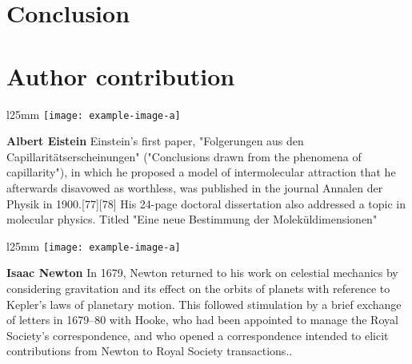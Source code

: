 \documentclass{SFEE}
\begin{document}
\section{Conclusion}
\lipsum[18-27]

 


\section*{Author contribution}

\begin{wrapfigure}{l}{25mm} 
    \texttt{[image: example-image-a]}
  \end{wrapfigure}\par
  \textbf{Albert Eistein} Einstein's first paper, "Folgerungen aus den Capillaritätserscheinungen" ("Conclusions drawn from the phenomena of capillarity"), in which he proposed a model of intermolecular attraction that he afterwards disavowed as worthless, was published in the journal Annalen der Physik in 1900.[77][78] His 24-page doctoral dissertation also addressed a topic in molecular physics. Titled "Eine neue Bestimmung der Moleküldimensionen"\par

\begin{wrapfigure}{l}{25mm} 
    \texttt{[image: example-image-a]}
  \end{wrapfigure}\par
  \textbf{Isaac Newton} In 1679, Newton returned to his work on celestial mechanics by considering gravitation and its effect on the orbits of planets with reference to Kepler's laws of planetary motion. This followed stimulation by a brief exchange of letters in 1679–80 with Hooke, who had been appointed to manage the Royal Society's correspondence, and who opened a correspondence intended to elicit contributions from Newton to Royal Society transactions..\par
\end{document}
